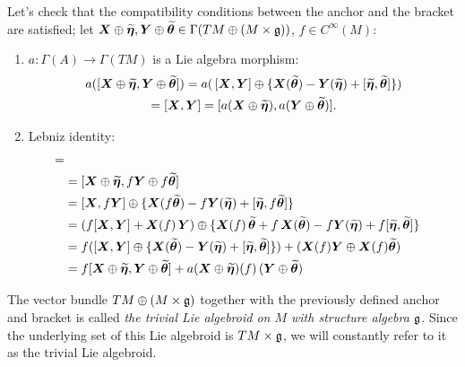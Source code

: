 Let's check that the compatibility conditions between the anchor and the bracket are satisfied; let $\bm{X} \oplus \widetilde{\bm{\eta}}, \bm{Y} \oplus \widetilde{\bm{\theta}} \in \Gamma(TM \oplus (M \times \mathfrak{g}))$, $f \in C^\infty(M)$:

    \begin{enumerate}
    \item $a: \Gamma(A) \to \Gamma(TM)$ is a Lie algebra morphism: 
    \begin{multline*}
    a([\bm{X} \oplus \widetilde{\bm{\eta}}, \bm{Y} \oplus \widetilde{\bm{\theta}}]) 
    = a(\, [\bm{X}, \bm{Y}] \oplus \{\bm{X}(\widetilde{\bm{\theta}}) - \bm{Y}(\widetilde{\bm{\eta}}) + [\widetilde{\bm{\eta}}, \widetilde{\bm{\theta}}]  \}) \\
    = [\bm{X}, \bm{Y}] 
    = [a(\bm{X} \oplus \widetilde{\bm{\eta}}), a(\bm{Y} \oplus \widetilde{\bm{\theta}})].    
    \end{multline*}
    
    
    \item Lebniz identity: 
    \begin{align*}
        [\sect X \oplus \stilde \eta, &f\, (\sect Y \oplus \stilde \theta)] =\\
        &= [\sect X \oplus \stilde \eta, f\sect Y \oplus f\stilde \theta] \\
        &=  [\sect X, f\sect Y] \oplus \{\sect X(f\stilde \theta) - f\sect Y(\stilde \eta) + [\stilde \eta, f\stilde \theta]\} \\
        &= (f[\sect X, \sect Y] + \sect X(f)\,\sect Y) \oplus \{\sect X(f)\,\stilde \theta + f\,\sect X(\stilde \theta) - f\sect Y(\stilde \eta) + f[\stilde \eta, \stilde \theta]\} \\
        &=f([\sect X, \sect Y] \oplus \{ \sect X(\stilde \theta) -\sect Y(\stilde \eta) + [\stilde \eta, \stilde \theta]\} ) + (\sect X(f) \sect Y \oplus \sect X(f)\stilde \theta) \\
        &= f[\sect X \oplus \stilde \eta, \sect Y \oplus \stilde \theta] + a(\sect X \oplus \stilde \eta)(f) \, (\sect Y \oplus \stilde \theta)
    \end{align*}
    \end{enumerate}

The vector bundle $TM \oplus (M \times \mathfrak{g})$ together with the previously defined anchor and bracket is called \emph{the trivial Lie algebroid on $M$ with structure algebra $\mathfrak{g}$}. Since the underlying set of this Lie algebroid is $TM \times \mathfrak{g}$, we will constantly refer to it as the trivial Lie algebroid.






